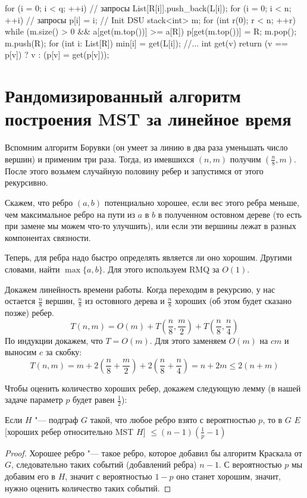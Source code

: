 \begin{cppcode}
for (i = 0; i < q; ++i) // запросы
	List[R[i]].push_back(L[i]);
for (i = 0; i < n; ++i) // запросы
	p[i] = i; // Init DSU
stack<int> m;
for (int r(0); r < n; ++r)
	while (m.size() > 0 && a[get(m.top())] >= a[R])
		p[get(m.top())] = R;
		m.pop();
	m.push(R);
	for (int i: List[R])
		min[i] = get(L[i]);
//...
int get(v) {
	return (v == p[v]) ? v : (p[v] = get(p[v]));
}
\end{cppcode}

\section{Рандомизированный алгоритм построения MST за линейное время}

Вспомним алгоритм Борувки (он умеет за линию в два раза уменьшать число вершин) и применим три раза.
Тогда, из имевшихся $(n, m)$ получим $\left(\frac{n}{8}, m\right)$.
После этого возьмем случайную половину ребер и запустимся от этого рекурсивно.

Скажем, что ребро $(a, b)$ потенциально хорошее, если вес этого ребра меньше,
чем максимальное ребро на пути из $a$ в $b$ в полученном остовном дереве (то есть при замене мы можем что-то улучшить),
или если эти вершины лежат в разных компонентах связности.

Теперь, для ребра надо быстро определять является ли оно хорошим.
Другими словами, найти $\max\{a, b\}$. Для этого используем RMQ за $O(1)$.

Докажем линейность времени работы.
Когда переходим в рекурсию, у нас остается $\frac{n}{8}$ вершин, $\frac{n}{8}$ из остовного дерева
и $\frac{n}{8}$ хороших (об этом будет сказано позже) ребер.
\[ T(n, m) = O(m) + T\left(\frac{n}{8}, \frac{m}{2}\right) + T\left(\frac{n}{8}, \frac{n}{4}\right) \]
По индукции докажем, что $T = O(m)$. Для этого заменяем $O(m)$ на $cm$ и выносим $c$ за скобку:
\[ T(n, m) = m + 2\left(\frac{n}{8} + \frac{m}{2}\right) + 2\left(\frac{n}{8} + \frac{n}{4}\right) = n + 2m \le 2(n + m) \]

Чтобы оценить количество хороших ребер, докажем следующую лемму (в нашей задаче параметр $p$ будет равен  $\frac{1}{2}$):

\begin{lemma}
	Если $H$ "--- подграф $G$ такой, что любое ребро взято с вероятностью $p$, то в $G$
	$E$[хороших ребер относительно 	{MST} $H$] $\le (n - 1)(\frac{1}{p} - 1)$
\end{lemma}
\begin{proof}
	Хорошее ребро "--- такое ребро, которое добавил бы алгоритм Краскала от $G$, следовательно таких событий (добавлений ребра) $n - 1$.
	С вероятностью $p$ мы добавим его в $H$, значит с вероятностью $1 - p$ оно станет хорошим, значит, нужно оценить количество таких событий.
\end{proof}

